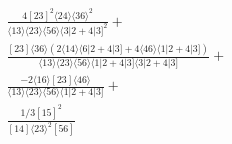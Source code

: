 \documentclass[varwidth, border=5pt]{standalone}
\begin{document}
\begin{my}
$\begin{gathered}
\scriptscriptstyle\frac{4[23]^2⟨24⟩⟨36⟩^2}{⟨13⟩⟨23⟩⟨56⟩⟨3|2+4|3]^2}+\\
\scriptscriptstyle\frac{[23]⟨36⟩(2⟨14⟩⟨6|2+4|3]+4⟨46⟩⟨1|2+4|3])}{⟨13⟩⟨23⟩⟨56⟩⟨1|2+4|3]⟨3|2+4|3]}+\\
\scriptscriptstyle\frac{-2⟨16⟩[23]⟨46⟩}{⟨13⟩⟨23⟩⟨56⟩⟨1|2+4|3]}+\\
\scriptscriptstyle\frac{1/3[15]^2}{[14]⟨23⟩^2[56]}\phantom{+}
\end{gathered}$
\end{my}
\end{document}
